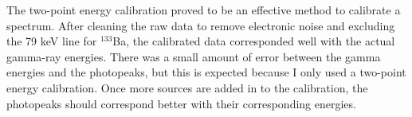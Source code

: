 The two-point energy calibration proved to be an effective method to calibrate a
spectrum. After cleaning the raw data to remove electronic noise and excluding
the 79 keV line for $^{133}$Ba, the calibrated data corresponded well with the actual
gamma-ray energies. There was a small amount of error between the gamma energies
and the photopeaks, but this is expected because I only used a two-point
energy calibration. Once more sources are added in to the calibration, the photopeaks
should correspond better with their corresponding energies.
